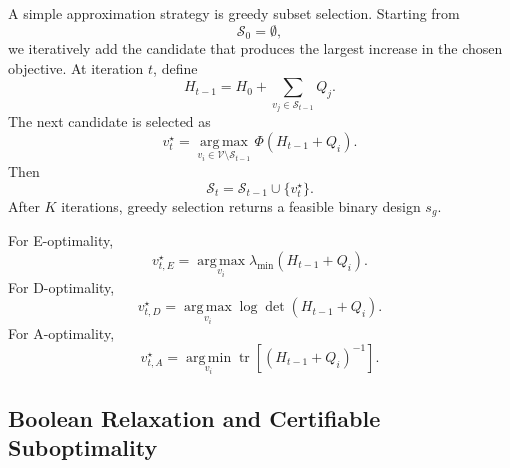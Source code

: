 \documentclass[letterpaper, 9
 pt, conference]{ieeeconf}
\begin{document}
A simple approximation strategy is greedy subset selection. Starting from
\begin{equation}
    \mathcal{S}_0=\emptyset,
\end{equation}
we iteratively add the candidate that produces the largest increase in the chosen objective. At iteration $t$, define
\begin{equation}
    H_{t-1}
    =
    H_0+\sum_{v_j\in\mathcal{S}_{t-1}}Q_j.
\end{equation}
The next candidate is selected as
\begin{equation}
    v_t^\star
    =
    \operatorname*{arg\,max}_{v_i\in\mathcal{V}\setminus\mathcal{S}_{t-1}}
    \Phi(H_{t-1}+Q_i).
\end{equation}
Then
\begin{equation}
    \mathcal{S}_t
    =
    \mathcal{S}_{t-1}\cup\{v_t^\star\}.
\end{equation}
After $K$ iterations, greedy selection returns a feasible binary design $s_g$.

For E-optimality,
\begin{equation}
    v_{t,E}^\star
    =
    \operatorname*{arg\,max}_{v_i}
    \lambda_{\min}(H_{t-1}+Q_i).
\end{equation}
For D-optimality,
\begin{equation}
    v_{t,D}^\star
    =
    \operatorname*{arg\,max}_{v_i}
    \log\det(H_{t-1}+Q_i).
\end{equation}
For A-optimality,
\begin{equation}
    v_{t,A}^\star
    =
    \operatorname*{arg\,min}_{v_i}
    \operatorname{tr}
    \left[
    (H_{t-1}+Q_i)^{-1}
    \right].
\end{equation}

\subsection{Boolean Relaxation and Certifiable Suboptimality}
\label{subsec:boolean_relaxation}
\end{document}
